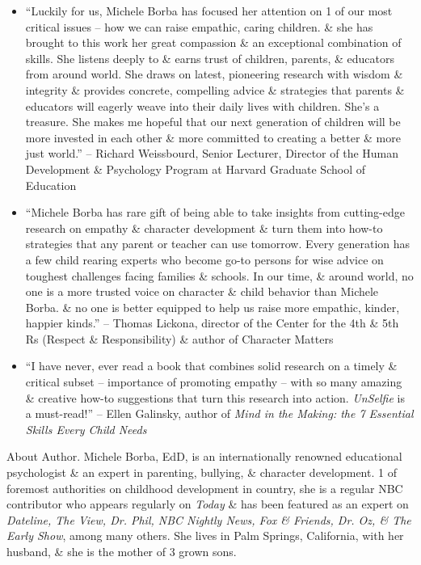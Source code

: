\documentclass{article}
\begin{document}
\begin{enumerate}
\begin{itemize}
		\item ``Luckily for us, {\sc Michele Borba} has focused her attention on 1 of our most critical issues -- how we can raise empathic, caring children. \& she has brought to this work her great compassion \& an exceptional combination of skills. She listens deeply to \& earns trust of children, parents, \& educators from around world. She draws on latest, pioneering research with wisdom \& integrity \& provides concrete, compelling advice \& strategies that parents \& educators will eagerly weave into their daily lives with children. She's a treasure. She makes me hopeful that our next generation of children will be more invested in each other \& more committed to creating a better \& more just world.'' -- {\sc Richard Weissbourd}, Senior Lecturer, Director of the Human Development \& Psychology Program at Harvard Graduate School of Education
		\item ``{\sc Michele Borba} has rare gift of being able to take insights from cutting-edge research on empathy \& character development \& turn them into how-to strategies that any parent or teacher can use tomorrow. Every generation has a few child rearing experts who become go-to persons for wise advice on toughest challenges facing families \& schools. In our time, \& around world, no one is a more trusted voice on character \& child behavior than {\sc Michele Borba}. \& no one is better equipped to help us raise more empathic, kinder, happier kinds.'' -- {\sc Thomas Lickona}, director of the Center for the 4th \& 5th Rs (Respect \& Responsibility) \& author of {\sc Character Matters}
		\item ``I have never, ever read a book that combines solid research on a timely \& critical subset -- importance of promoting empathy -- with so many amazing \& creative how-to suggestions that turn this research into action. {\it UnSelfie} is a must-read!'' -- {\sc Ellen Galinsky}, author of {\it Mind in the Making: the 7 Essential Skills Every Child Needs}
	\end{itemize}
	{\sf About Author.} {\sc Michele Borba}, EdD, is an internationally renowned educational psychologist \& an expert in parenting, bullying, \& character development. 1 of foremost authorities on childhood development in country, she is a regular NBC contributor who appears regularly on {\it Today}  \& has been featured as an expert on {\it Dateline, The View, Dr. Phil, NBC Nightly News, Fox \& Friends, Dr. Oz, \& The Early Show}, among many others. She lives in Palm Springs, California, with her husband, \& she is the mother of 3 grown sons.


\end{enumerate}
\end{document}
